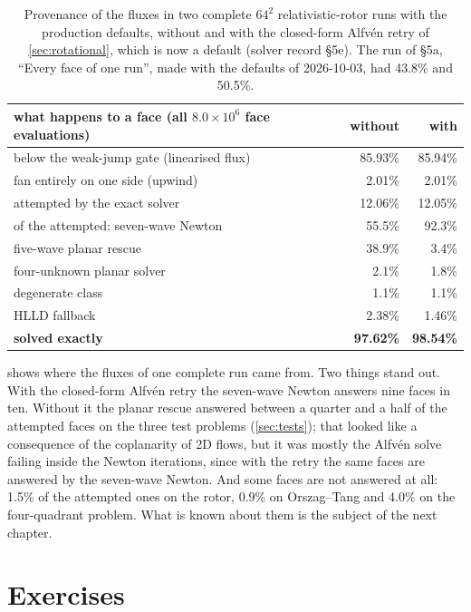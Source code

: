 \documentclass[11pt,a4paper,oneside,openany]{book}
\theoremstyle{definition}
\theoremstyle{plain}
\theoremstyle{remark}
\begin{document}
\begin{table}[t]
\centering\small
\begin{tabular}{@{}lrr@{}}
\toprule
what happens to a face (all $8.0\times10^6$ face evaluations) & without & with\\
\midrule
below the weak-jump gate (linearised flux) & 85.93\% & 85.94\%\\
fan entirely on one side (upwind) & 2.01\% & 2.01\%\\
attempted by the exact solver & 12.06\% & 12.05\%\\
\midrule
of the attempted: seven-wave Newton & 55.5\% & 92.3\%\\
\phantom{of the attempted: }five-wave planar rescue & 38.9\% & 3.4\%\\
\phantom{of the attempted: }four-unknown planar solver & 2.1\% & 1.8\%\\
\phantom{of the attempted: }degenerate class & 1.1\% & 1.1\%\\
\phantom{of the attempted: }HLLD fallback & 2.38\% & 1.46\%\\
\phantom{of the attempted: }\textbf{solved exactly} & \textbf{97.62\%} & \textbf{98.54\%}\\
\bottomrule
\end{tabular}
\caption{Provenance of the fluxes in two complete $64^2$ relativistic-rotor runs with the
production defaults, without and with the closed-form Alfvén retry of
\cref{sec:rotational}, which is now a default (solver record \S5e). The run of \S5a,
``Every face of one run'', made with the defaults of 2026-10-03, had 43.8\% and 50.5\%.}
\label{tab:provenance}
\end{table}

 shows where the fluxes of one complete run came from. Two things
stand out. With the closed-form Alfvén retry the seven-wave Newton answers nine faces in
ten. Without it the planar rescue answered between a quarter and a half of the attempted
faces on the three test problems (\cref{sec:tests}); that looked like a consequence of the
coplanarity of 2D flows, but it was mostly the Alfvén solve failing inside the Newton
iterations, since with the retry the same faces are answered by the seven-wave Newton. And
some faces are not answered at all: 1.5\% of the attempted ones on the rotor, 0.9\% on
Orszag--Tang and 4.0\% on the four-quadrant problem. What is known about them is the
subject of the next chapter.

\section*{Exercises}
\end{document}
